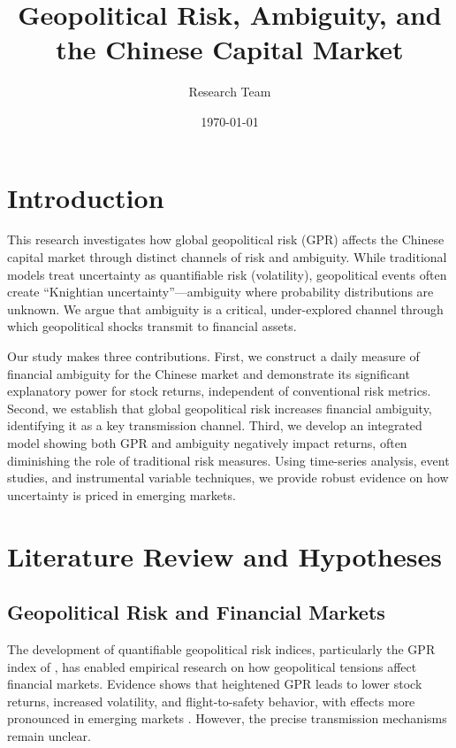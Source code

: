 \documentclass[12pt]{article}
\title{Geopolitical Risk, Ambiguity, and the Chinese Capital Market}
\author{Research Team}
\date{\today}
\begin{document}
\maketitle

\section{Introduction}

This research investigates how global geopolitical risk (GPR) affects the Chinese capital market through distinct channels of risk and ambiguity. While traditional models treat uncertainty as quantifiable risk (volatility), geopolitical events often create ``Knightian uncertainty''---ambiguity where probability distributions are unknown. We argue that ambiguity is a critical, under-explored channel through which geopolitical shocks transmit to financial assets.

Our study makes three contributions. First, we construct a daily measure of financial ambiguity for the Chinese market and demonstrate its significant explanatory power for stock returns, independent of conventional risk metrics. Second, we establish that global geopolitical risk increases financial ambiguity, identifying it as a key transmission channel. Third, we develop an integrated model showing both GPR and ambiguity negatively impact returns, often diminishing the role of traditional risk measures. Using time-series analysis, event studies, and instrumental variable techniques, we provide robust evidence on how uncertainty is priced in emerging markets.

\section{Literature Review and Hypotheses}

\subsection{Geopolitical Risk and Financial Markets}

The development of quantifiable geopolitical risk indices, particularly the GPR index of \citet{caldara2022geopolitical}, has enabled empirical research on how geopolitical tensions affect financial markets. Evidence shows that heightened GPR leads to lower stock returns, increased volatility, and flight-to-safety behavior, with effects more pronounced in emerging markets \citep{caldara2022geopolitical}. However, the precise transmission mechanisms remain unclear.
\end{document}
